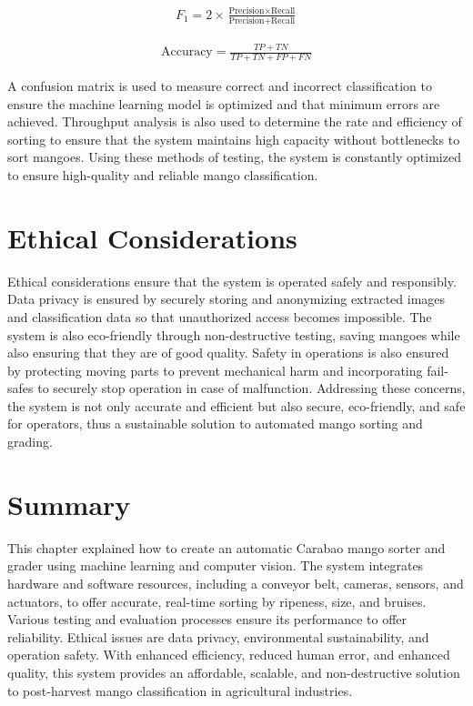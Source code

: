 \begin{eqnarray}
	F_1 = 2\times \frac{\text{Precision} \times \text{Recall}}{\text{Precision} + \text{Recall}}
	\label{eq:f1_score}
\end{eqnarray}

\begin{eqnarray}
	\text{Accuracy} = \frac{TP + TN}{TP + TN + FP + FN}
	\label{eq:accuracy}
\end{eqnarray}

A confusion matrix is used to measure correct and incorrect classification to ensure the machine learning model is optimized and that minimum errors are achieved. Throughput analysis is also used to determine the rate and efficiency of sorting to ensure that the system maintains high capacity without bottlenecks to sort mangoes. Using these methods of testing, the system is constantly optimized to ensure high-quality and reliable mango classification.

\section{Ethical Considerations}
Ethical considerations ensure that the system is operated safely and responsibly. Data privacy is ensured by securely storing and anonymizing extracted images and classification data so that unauthorized access becomes impossible. The system is also eco-friendly through non-destructive testing, saving mangoes while also ensuring that they are of good quality. Safety in operations is also ensured by protecting moving parts to prevent mechanical harm and incorporating fail-safes to securely stop operation in case of malfunction. Addressing these concerns, the system is not only accurate and efficient but also secure, eco-friendly, and safe for operators, thus a sustainable solution to automated mango sorting and grading.

\section{Summary}
This chapter explained how to create an automatic Carabao mango sorter and grader using machine learning and computer vision. The system integrates hardware and software resources, including a conveyor belt, cameras, sensors, and actuators, to offer accurate, real-time sorting by ripeness, size, and bruises. Various testing and evaluation processes ensure its performance to offer reliability. Ethical issues are data privacy, environmental sustainability, and operation safety. With enhanced efficiency, reduced human error, and enhanced quality, this system provides an affordable, scalable, and non-destructive solution to post-harvest mango classification in agricultural industries.
